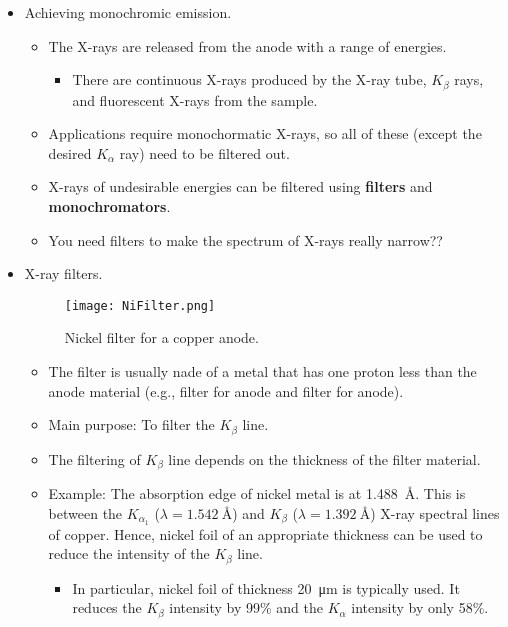 \documentclass[../notes.tex]{subfiles}
\begin{document}
\begin{itemize}
    \item Achieving monochromic emission.
    \begin{itemize}
        \item The X-rays are released from the anode with a range of energies.
        \begin{itemize}
            \item There are continuous X-rays produced by the X-ray tube, $K_\beta$ rays, and fluorescent X-rays from the sample.
        \end{itemize}
        \item Applications require monochormatic X-rays, so all of these (except the desired $K_\alpha$ ray) need to be filtered out.
        \item X-rays of undesirable energies can be filtered using \textbf{filters} and \textbf{monochromators}.
        \item You need filters to make the spectrum of X-rays really narrow??
    \end{itemize}
    \item X-ray filters.
    \begin{figure}[h!]
        \centering
        \texttt{[image: NiFilter.png]}
        \caption{Nickel filter for a copper anode.}
        \label{fig:NiFilter}
    \end{figure}
    \begin{itemize}
        \item The filter is usually nade of a metal that has one proton less than the anode material (e.g.,  filter for  anode and  filter for  anode).
        \item Main purpose: To filter the $K_\beta$ line.
        \item The filtering of $K_\beta$ line depends on the thickness of the filter material.
        \item Example: The absorption edge of nickel metal is at \SI{1.488}{\angstrom}. This is between the $K_{\alpha_1}$ ($\lambda=\SI{1.542}{\angstrom}$) and $K_\beta$ ($\lambda=\SI{1.392}{\angstrom}$) X-ray spectral lines of copper. Hence, nickel foil of an appropriate thickness can be used to reduce the intensity of the  $K_\beta$ line.
        \begin{itemize}
            \item In particular, nickel foil of thickness \SI{20}{\micro\meter} is typically used. It reduces the $K_\beta$ intensity by 99\% and the $K_\alpha$ intensity by only 58\%.
        \end{itemize}

\end{itemize}
\end{itemize}
\end{document}
